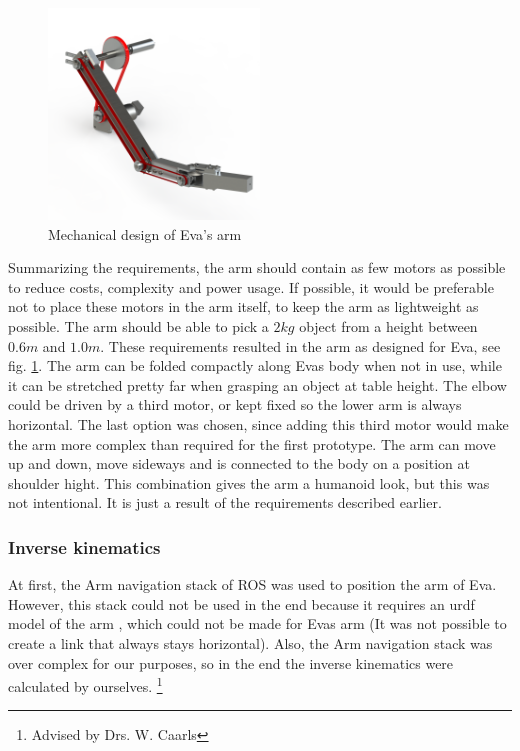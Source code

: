 \documentclass[project_eva.tex]{subfiles}
\begin{document}
\begin{figure}[h]
	\centering
	\mbox{\includegraphics[width=0.5\textwidth]{Images/armMechOverview.png}}
	\caption{Mechanical design of Eva's arm}
	\label{fig:armMechOverview}
\end{figure}

Summarizing the requirements, the arm should contain as few motors as possible to reduce costs, complexity and power usage. If possible, it would be preferable not to place these motors in the arm itself, to keep the arm as lightweight as possible. The arm should be able to pick a $2kg$ object from a height between $0.6m$ and $1.0m$. These requirements resulted in the arm as designed for Eva, see fig. \ref{fig:armMechOverview}.
The arm can be folded compactly along Eva\textquotesingle s body when not in use, while it can be stretched pretty far when grasping an object at table height. The elbow could be driven by a third motor, or kept fixed so the lower arm is always horizontal. The last option was chosen, since adding this third motor would make the arm more complex than required for the first prototype. The arm can move up and down, move sideways and is connected to the body on a position at shoulder hight. This combination gives the arm a humanoid look, but this was not intentional. It is just a result of the requirements described earlier.

\subsubsection*{Inverse kinematics}
At first, the Arm navigation stack of ROS was used to position the arm of Eva. However, this stack could not be used in 
the end because it requires an urdf model of the arm \cite{urdf}, which could not be made for Eva\textquotesingle s arm (It was not possible to create a link that always stays horizontal). Also, the Arm navigation stack was over complex for our purposes, so in the end the inverse kinematics were calculated by ourselves. \footnote{Advised by Drs. W. Caarls} 
\end{document}
